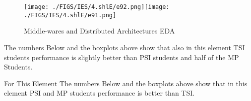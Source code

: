 \documentclass[12pt]{extreport}
\begin{document}
\begin{figure}[H]
	\centering
	\texttt{[image: ./FIGS/IES/4.shlE/e92.png]}\texttt{[image: ./FIGS/IES/4.shlE/e91.png]}
	\label{fig:52}
	\caption{Middle-wares and Distributed Architectures EDA}
\end{figure}

The numbers Below and the boxplots above show that also in this element  TSI students performance is slightly better than PSI students and half of the MP Students.

For This Element The numbers Below and the boxplots above show that in this element  PSI and MP students performance is  better than TSI.


\begin{comment}
\subparagraph{Interpretation of the Box-plots:}
For This Element 

\begin{enumerate}	
	\item The MP Class Box-Plot:
	\begin{enumerate}
		\item MAX = a {} {} {} {} {} {} {} {} UQ = b {} {} {} {} {} {} {} {} Median = c
		\item LQ = d {} {} {} {} {} {} {} {}  MIN =	l {} {} {} {} {} {} {} {}  IQR = e - f = g
	\end{enumerate}
	\item The PSI Class Box-Plot:
	\begin{enumerate}
		\item MAX = a {} {} {} {} {} {} {} {} UQ = b {} {} {} {} {} {} {} {} Median = c
		\item LQ = d {} {} {} {} {} {} {} {}  MIN =	e {} {} {} {} {} {} {} {} IQR = f - g = h	
	\end{enumerate}
	\item The TSI Class Box-Plot:
	\begin{enumerate}
		\item MAX = a {} {} {} {} {} {} {} {} UQ = b {} {} {} {} {} {} {} {} Median = c
		\item LQ = d {} {} {} {} {} {} {} {} MIN = e {} {} {} {} {} {} {} {} IQR = f - g = h	
	\end{enumerate}
\end{enumerate}


\subparagraph{Interpretation of the histogram:}
This Frequency Distribution is (Skeness) with the following descriptive statistics:
\begin{enumerate}
	\item Mean = 
	\item STD = 
	\item Range = a - b = c
	\item IQR = a-b = c 
\end{enumerate}

\end{comment}
\end{document}
